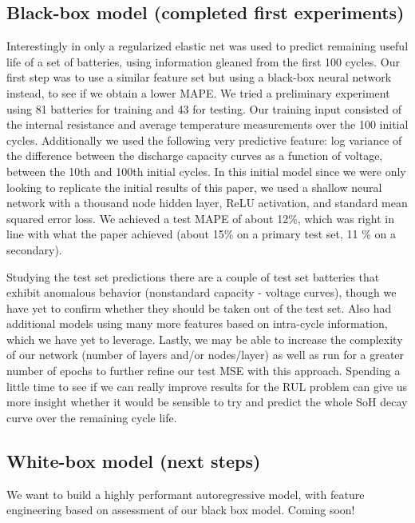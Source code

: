 \documentclass{article}
\begin{document}
\subsection{Black-box model (completed first experiments)}
Interestingly in \cite{severson2019data} only a regularized elastic net was used to predict remaining useful life of a set of batteries, using information gleaned from the first 100 cycles.  Our first step was to use a similar feature set but using a black-box neural network instead, to see if we obtain a lower MAPE.  We tried a preliminary experiment using 81 batteries for training and 43 for testing.  Our training input consisted of the internal resistance and average temperature measurements over the 100 initial cycles.  Additionally we used the following very predictive feature: log variance of the difference between the discharge capacity curves as a function of voltage, between the 10th and 100th initial cycles.  In this initial model since we were only looking to replicate the initial results of this paper, we used a shallow neural network with a thousand node hidden layer, ReLU activation, and standard mean squared error loss.  We achieved a test MAPE of about 12$\%$, which was right in line with what the paper achieved (about 15$\%$ on a primary test set, 11 $\%$ on a secondary).  

Studying the test set predictions there are a couple of test set batteries that exhibit anomalous behavior (nonstandard capacity - voltage curves), though we have yet to confirm whether they should be taken out of the test set.  Also \cite{severson2019data} had additional models using many more features based on intra-cycle information, which we have yet to leverage.  Lastly, we may be able to increase the complexity of our network (number of layers and/or nodes/layer) as well as run for a greater number of epochs to further refine our test MSE with this approach.  Spending a little time to see if we can really improve results for the RUL problem can give us more insight whether it would be sensible to try and predict the whole SoH decay curve over the remaining cycle life.

\subsection{White-box model (next steps)}
We want to build a highly performant autoregressive model, with feature engineering based on assessment of our black box model. Coming soon!







\end{document}
